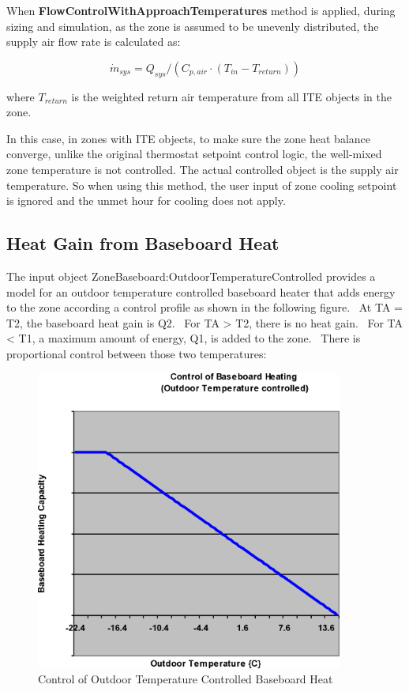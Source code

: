 When \textbf{FlowControlWithApproachTemperatures} method is applied, during sizing and simulation, as the zone is assumed to be unevenly distributed, the supply air flow rate is calculated as:

\begin{equation}
{\dot m_{sys}} = {Q_{sys}}/({C_{p,air}} \cdot ({T_{in}} - {T_{return}}))
\end{equation}

where $T_{return}$ is the weighted return air temperature from all ITE objects in the zone. 

In this case, in zones with ITE objects, to make sure the zone heat balance converge, unlike the original thermostat setpoint control logic, the well-mixed zone temperature is not controlled. The actual controlled object is the supply air temperature. So when using this method, the user input of zone cooling setpoint is ignored and the unmet hour for cooling does not apply.

\subsection{Heat Gain from Baseboard Heat}\label{heat-gain-from-baseboard-heat}

The input object ZoneBaseboard:OutdoorTemperatureControlled provides a model for an outdoor temperature controlled baseboard heater that adds energy to the zone according a control profile as shown in the following figure.~ At TA = T2, the baseboard heat gain is Q2.~ For TA \textgreater{} T2, there is no heat gain.~ For TA \textless{} T1, a maximum amount of energy, Q1, is added to the zone.~ There is proportional control between those two temperatures:

\begin{figure}[hbtp] %
\centering
\includegraphics[width=0.9\textwidth, height=0.9\textheight, keepaspectratio=true]{media/image5821.png}
\caption{Control of Outdoor Temperature Controlled Baseboard Heat \protect \label{fig:control-of-outdoor-temperature-controlled}}
\end{figure}

